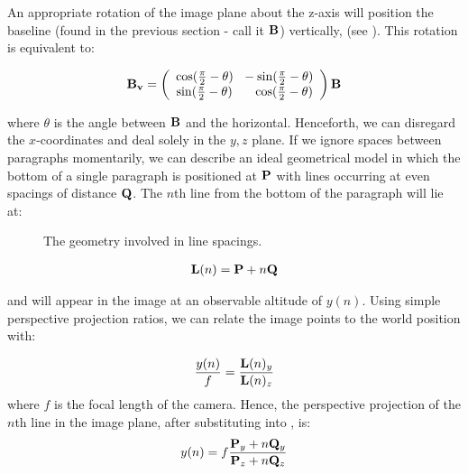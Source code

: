 An appropriate rotation of the image plane about the z-axis will position the
baseline (found in the previous section - call it ${ \bf B }$) vertically, 
(see ). This rotation is equivalent to:

\begin{equation}
{ \bf B_{v} } = \left(\begin{array}{cc}\cos(\frac{\pi}{2}-\theta) ~ ~ -\sin(\frac{\pi}{2}-\theta)\\\sin(\frac{\pi}{2}-\theta) ~  ~  ~ ~ ~ \cos(\frac{\pi}{2}-\theta)\end{array}\right) { \bf B } \label{uprightbaseline}
\end{equation}

{\parindent 0mm
where $\theta$ is the angle between ${ \bf B }$ and the horizontal.
Henceforth, we can disregard the $x$-coordinates and deal
solely in the $y,z$ plane. 
If we ignore spaces between paragraphs momentarily,
we can describe an ideal geometrical model in which
the bottom of a single paragraph is positioned
at ${ \bf P }$ with lines occurring at even spacings of distance ${ \bf Q }$.
The $n$th line from the bottom of the paragraph will lie at:
}

\begin{figure}[t]
\centering
\begin{center}
\caption{The geometry involved in line spacings.}
\label{zyspacings}
\end{center}
\end{figure}

\begin{eqnarray}
{ \bf L }(n) = { \bf P }+n{ \bf Q } \label{nthline}
\end{eqnarray}

and will appear in the image at an observable altitude of $y(n)$.
{\parindent 0mm
Using simple perspective projection ratios, we can relate the image points to the world position with:
}

\begin{eqnarray}
\frac{y(n)}{f}  = \frac{ { \bf L }(n)_y }{ { \bf L }(n)_z }  \label{spacingspq1}
\end{eqnarray}
{\parindent 0mm
where $f$ is the focal length of the camera. Hence, the perspective projection
of the  $n$th line in the image plane, after substituting  into
, is: 
}
\begin{eqnarray}
y(n) =  f \frac{ { \bf P }_y + n { \bf Q }_y }{ { \bf P }_z + n{ \bf Q }_z } \label{spacingspq}
\end{eqnarray}

